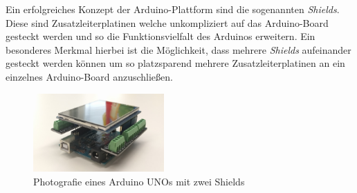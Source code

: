 Ein erfolgreiches Konzept der Arduino-Plattform sind die sogenannten \textit{Shields}.
Diese sind Zusatzleiterplatinen welche unkompliziert auf das Arduino-Board gesteckt werden und so die Funktionsvielfalt des Arduinos erweitern.
Ein besonderes Merkmal hierbei ist die Möglichkeit, dass mehrere \textit{Shields} aufeinander gesteckt werden können um so platzsparend mehrere Zusatzleiterplatinen an ein einzelnes Arduino-Board anzuschließen.
\begin{figure}[H]
	\centering
	\includegraphics[width=5cm]{images/chapter/02/arduino_shields.jpg}
	\caption{Photografie eines Arduino UNOs mit zwei Shields}
	\label{fig:arduino_shield}
\end{figure}
